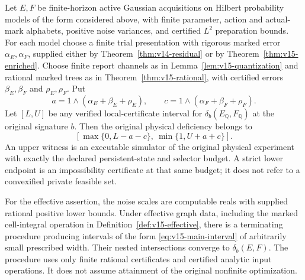 \begin{theorem}
\label{thm:v15-main}
Let $E,F$ be finite-horizon active Gaussian acquisitions on Hilbert
probability models of the form considered above, with finite parameter,
action and actual-mark alphabets, positive noise variances, and certified
$L^2$ preparation bounds. For each model choose a finite trial
presentation with rigorous marked error $\alpha_E,\alpha_F$, supplied
either by Theorem~\ref{thm:v14-residual} or by
Theorem~\ref{thm:v15-enriched}. Choose finite report channels as in
Lemma~\ref{lem:v15-quantization} and rational marked trees as in
Theorem~\ref{thm:v15-rational}, with certified errors $\beta_E,\beta_F$
and $\rho_E,\rho_F$. Put
\[
 a=1\wedge(\alpha_E+\beta_E+\rho_E),\qquad
 c=1\wedge(\alpha_F+\beta_F+\rho_F).
\]
Let $[L,U]$ be any verified local-certificate interval for
$\delta_b(E_{\mathbb Q},F_{\mathbb Q})$ at the original signature $b$.
Then the original physical deficiency belongs to
\begin{equation}\label{eq:v15-main-interval}
 \left[\max\{0,L-a-c\},\ \min\{1,U+a+c\}\right].
\end{equation}
An upper witness is an executable simulator of the original physical
experiment with exactly the declared persistent-state and selector
budget. A strict lower endpoint is an impossibility certificate at that
same budget; it does not refer to a convexified private feasible set.

For the effective assertion, the noise scales are computable reals
with supplied rational positive lower bounds. Under effective graph
data, including the marked cell-integral
operation in Definition~\ref{def:v15-effective}, there is a terminating
procedure producing intervals of the form \eqref{eq:v15-main-interval}
of arbitrarily small prescribed width. Their nested intersections
converge to $\delta_b(E,F)$. The procedure uses only finite rational
certificates and certified analytic input operations. It does not assume
attainment of the original nonfinite optimization.
\end{theorem}

